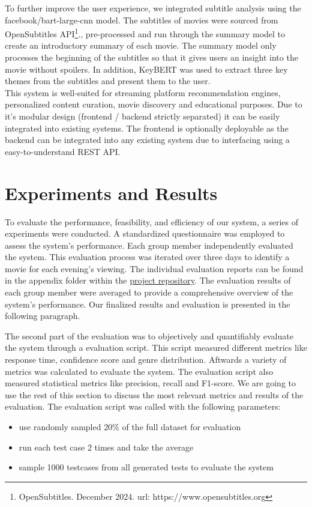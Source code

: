 \documentclass[12pt,a4paper]{article}
\begin{document}
\noindent To further improve the user experience, we integrated subtitle analysis using the facebook/bart-large-cnn model. 
The subtitles of movies were sourced from OpenSubtitles API\footnote{\label{OpenSubtitles}OpenSubtitles. December 2024. url: https://www.opensubtitles.org}., pre-processed and run through the summary model to create an introductory summary of each movie. 
The summary model only processes the beginning of the subtitles so that it gives users an insight into the movie without spoilers. 
In addition, KeyBERT was used to extract three key themes from the subtitles and present them to the user. 
\newline \\
\noindent This system is well-suited for streaming platform recommendation engines, personalized content curation, movie discovery and educational purposes.
Due to it's modular design (frontend / backend strictly separated) it can be easily integrated into existing systems.
The frontend is optionally deployable as the backend can be integrated into any existing system due to interfacing
using a easy-to-understand REST API.

\section{Experiments and Results}

To evaluate the performance, feasibility, and efficiency of our system, a series of experiments were conducted.
A standardized questionnaire was employed to assess the system’s performance.
Each group member independently evaluated the system.
This evaluation process was iterated over three days to identify a movie for each evening’s viewing.
The individual evaluation reports can be found in the appendix folder within the
\href{https://github.com/IImpaq/air-2024/appendix}{project repository}.
The evaluation results of each group member were averaged to provide a comprehensive overview of the system’s performance.
Our finalized results and evaluation is presented in the following paragraph.


\noindent The second part of the evaluation was to objectively and quantifiably evaluate the system through a evaluation script.
This script measured different metrics like response time, confidence score and genre distribution.
Aftwards a variety of metrics was calculated to evaluate the system.
The evaluation script also measured statistical metrics like precision, recall and F1-score.
We are going to use the rest of this section to discuss the most relevant metrics and results of the evaluation.
The evaluation script was called with the following parameters:
\begin{itemize}
  \item use randomly sampled 20\% of the full dataset for evaluation
  \item run each test case 2 times and take the average
  \item sample 1000 testcases from all generated tests to evaluate the system
\end{itemize}
\end{document}
